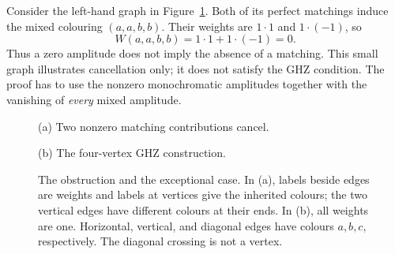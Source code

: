 \documentclass[11pt]{article}
\theoremstyle{definition}
\theoremstyle{plain}
\numberwithin{equation}{section}
\begin{document}
Consider the left-hand graph in Figure~\ref{fig:examples}. Both of its
perfect matchings induce the mixed colouring \((a,a,b,b)\). Their weights
are \(1\cdot1\) and \(1\cdot(-1)\), so
\[
 W(a,a,b,b)=1\cdot1+1\cdot(-1)=0.
\]
Thus a zero amplitude does not imply the absence of a matching. This small
graph illustrates cancellation only; it does not satisfy the GHZ condition.
The proof has to use the nonzero monochromatic amplitudes together with
the vanishing of \emph{every} mixed amplitude.

\begin{figure}[htbp]
\centering
\begin{minipage}[t]{0.48\textwidth}
\centering
{}

\small (a) Two nonzero matching contributions cancel.
\end{minipage}\hfill
\begin{minipage}[t]{0.48\textwidth}
\centering
{}

\small (b) The four-vertex GHZ construction.
\end{minipage}
\caption{The obstruction and the exceptional case. In (a), labels beside
edges are weights and labels at vertices give the inherited colours; the
two vertical edges have different colours at their ends. In (b), all weights
are one. Horizontal, vertical, and diagonal edges have colours \(a,b,c\),
respectively. The diagonal crossing is not a vertex.}
\label{fig:examples}
\end{figure}
\end{document}
